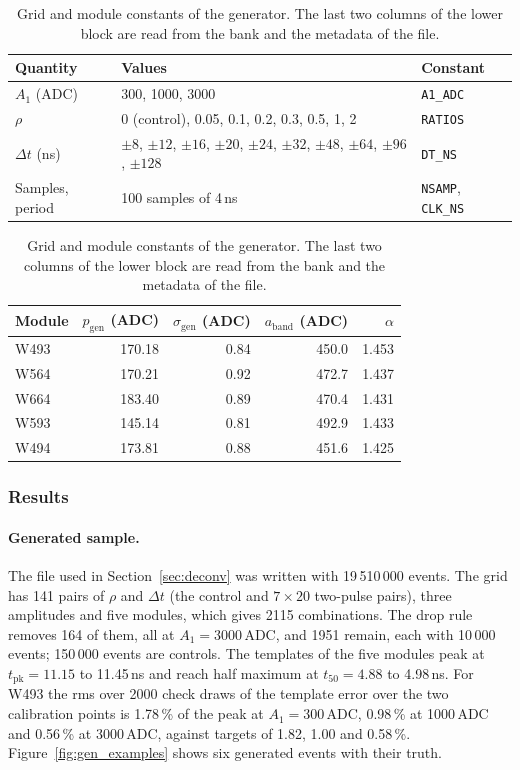 \documentclass[11pt]{article}
\newcommand{\adc}{\,\mathrm{ADC}}
\newcommand{\code}[1]{\texttt{#1}}
\begin{document}
\begin{table}[htbp]
\centering
\caption{Grid and module constants of the generator. The last two columns of the lower block are read from the bank and the metadata of the file.}
\label{tab:gen}
\small
\begin{tabular}{lp{}l}
\toprule
Quantity & Values & Constant \\
\midrule
$A_1$ (ADC) & 300, 1000, 3000 & \code{A1\_ADC} \\
$\rho$ & 0 (control), 0.05, 0.1, 0.2, 0.3, 0.5, 1, 2 & \code{RATIOS} \\
$\Delta t$ (ns) & $\pm 8$, $\pm 12$, $\pm 16$, $\pm 20$, $\pm 24$, $\pm 32$, $\pm 48$, $\pm 64$, $\pm 96$, $\pm 128$ & \code{DT\_NS} \\
Samples, period & 100 samples of 4\,ns & \code{NSAMP}, \code{CLK\_NS} \\
\bottomrule
\end{tabular}

\medskip
\begin{tabular}{lrrrr}
\toprule
Module & $p_{\mathrm{gen}}$ (ADC) & $\sigma_{\mathrm{gen}}$ (ADC) & $a_{\mathrm{band}}$ (ADC) & $\alpha$ \\
\midrule
W493 & 170.18 & 0.84 & 450.0 & 1.453 \\
W564 & 170.21 & 0.92 & 472.7 & 1.437 \\
W664 & 183.40 & 0.89 & 470.4 & 1.431 \\
W593 & 145.14 & 0.81 & 492.9 & 1.433 \\
W494 & 173.81 & 0.88 & 451.6 & 1.425 \\
\bottomrule
\end{tabular}
\end{table}

\subsubsection{Results}

\paragraph{Generated sample.} The file used in Section~\ref{sec:deconv} was written with 19\,510\,000 events. The grid has 141 pairs of $\rho$ and $\Delta t$ (the control and $7 \times 20$ two-pulse pairs), three amplitudes and five modules, which gives 2115 combinations. The drop rule removes 164 of them, all at $A_1 = 3000\adc$, and 1951 remain, each with 10\,000 events; 150\,000 events are controls. The templates of the five modules peak at $t_{\mathrm{pk}} = 11.15$ to 11.45\,ns and reach half maximum at $t_{50} = 4.88$ to 4.98\,ns. For W493 the rms over 2000 check draws of the template error over the two calibration points is 1.78\,\% of the peak at $A_1 = 300\adc$, 0.98\,\% at 1000\,ADC and 0.56\,\% at 3000\,ADC, against targets of 1.82, 1.00 and 0.58\,\%. Figure~\ref{fig:gen_examples} shows six generated events with their truth.
\end{document}
